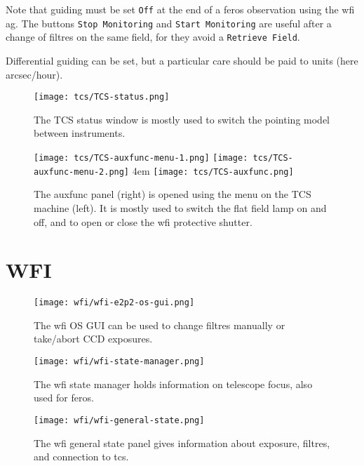 \documentclass[11pt,fleqn]{book} %
\begin{document}
Note that guiding must be set \texttt{Off} at the end of a \gls{feros} observation
using the \gls{wfi} \gls{ag}. The buttons \texttt{Stop Monitoring} and \texttt{Start Monitoring} are
useful after a change of filtres on the same field, for they avoid
a \texttt{Retrieve Field}.

Differential guiding can be set, but a particular care should be paid
to units (here arcsec/hour).


\begin{figure}[!ht]
\centering
\texttt{[image: tcs/TCS-status.png]}
\caption[Status window of the telescope control software]{The TCS status window is mostly used to switch the pointing model
between instruments.}
\label{fig:tcsstatus}
\end{figure}


\begin{figure}[!ht]
\centering
\texttt{[image: tcs/TCS-auxfunc-menu-1.png]}%
\texttt{[image: tcs/TCS-auxfunc-menu-2.png]}
\hglue 4em
\texttt{[image: tcs/TCS-auxfunc.png]}
\caption[Auxiliary functions of the telescope control software]{The \gls{auxfunc} panel (right) is opened using the menu
on the TCS machine (left). It is mostly used to switch the flat field 
lamp on and off, and to open or close the \gls{wfi} protective shutter.}
\label{fig:tcsauxfunc}
\end{figure}

\section{WFI}

\begin{figure}[!ht]
\centering
\texttt{[image: wfi/wfi-e2p2-os-gui.png]}
\caption[WFI OS GUI]{The \gls{wfi} OS GUI can be used to change filtres manually or
take/abort CCD exposures.}
\label{fig:wfios}
\end{figure}

\begin{figure}[!ht]
\centering
\texttt{[image: wfi/wfi-state-manager.png]}
\caption[WFI state manager]{The \gls{wfi} state manager holds information on telescope
focus, also used for \gls{feros}.}
\label{fig:wfistate}
\end{figure}

\begin{figure}[!ht]
\centering
\texttt{[image: wfi/wfi-general-state.png]}
\caption[WFI general state panel]{The \gls{wfi} general state panel gives information
about exposure, filtres, and connection to \gls{tcs}.}
\label{fig:wfigen}
\end{figure}
\end{document}
